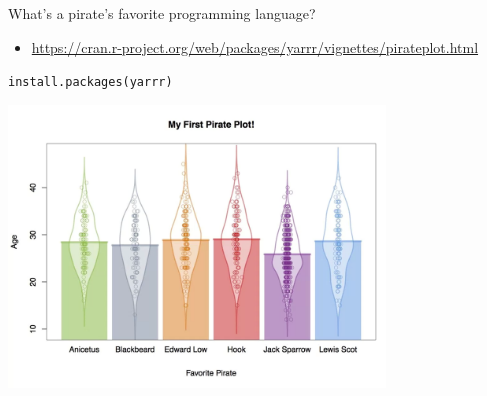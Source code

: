 \documentclass[
  ignorenonframetext,
]{beamer}
\providecommand{\tightlist}{%
  \setlength{\itemsep}{0pt}\setlength{\parskip}{0pt}}
\begin{document}
\begin{frame}[fragile]{What's a pirate's favorite programming language?}
\protect\hypertarget{whats-a-pirates-favorite-programming-language}{}

\begin{itemize}
\tightlist
\item
  \url{https://cran.r-project.org/web/packages/yarrr/vignettes/pirateplot.html}
\end{itemize}

\texttt{install.packages(\textquotesingle{}yarrr\textquotesingle{})}

\includegraphics[width=0.75\textwidth,height=\textheight]{../external/images/funR_2_pirate.png}

\end{frame}
\end{document}
